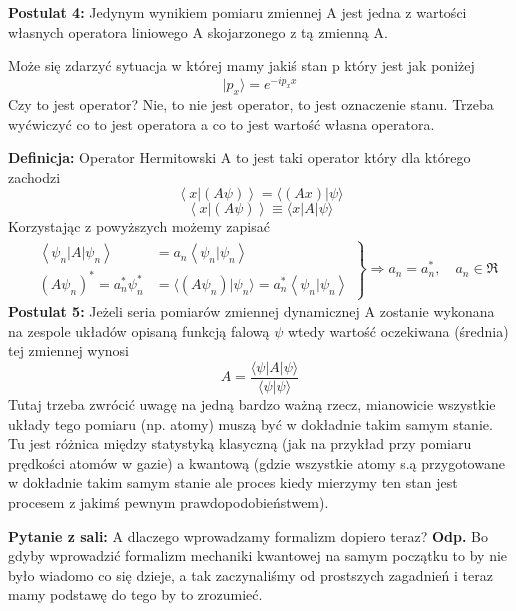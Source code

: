 \textbf{Postulat 4:} Jedynym wynikiem pomiaru zmiennej A jest jedna z wartości własnych operatora liniowego A skojarzonego z tą zmienną A.

Może się zdarzyć sytuacja w której mamy jakiś stan p który jest jak poniżej
\begin{equation*}
	|p_x \rangle = e^{-ip_x x}
\end{equation*}
Czy to jest operator? Nie, to nie jest operator, to jest oznaczenie stanu. Trzeba wyćwiczyć co to jest operatora a co to jest wartość własna operatora.

\textbf{Definicja:} Operator Hermitowski A to jest taki operator który dla którego zachodzi
\begin{equation*}
	\left< x | (A\psi) \right> = \langle (Ax) \vert \psi \rangle
\end{equation*}
\begin{equation*}
	\left< x | (A\psi) \right> \equiv \langle x | A \vert \psi \rangle
\end{equation*}
Korzystając z powyższych możemy zapisać
\begin{align*}
	&\left.
	\begin{aligned}
		\left< \psi_n | A | \psi_n \right> &= a_n \left< \psi_n | \psi_n \right> \\
		(A \psi_n)^* = a_n^* \psi_n^* &= \langle (A \psi_n) | \psi_n \rangle = a_n^* \left< \psi_n | \psi_n \right>
	\end{aligned}
	\right\}
	\Rightarrow a_n = a_n^*, \quad a_n \in \Re
\end{align*}
\textbf{Postulat 5:} Jeżeli seria pomiarów zmiennej dynamicznej A zostanie wykonana na zespole układów opisaną funkcją falową $\psi$ wtedy wartość oczekiwana (średnia) tej zmiennej wynosi
\begin{equation*}
	A = \frac{\langle \psi | A | \psi \rangle}{\langle\psi | \psi\rangle}
\end{equation*}
Tutaj trzeba zwrócić uwagę na jedną bardzo ważną rzecz, mianowicie wszystkie układy tego pomiaru (np. atomy) muszą być w dokładnie takim samym stanie. Tu jest różnica między statystyką klasyczną (jak na przykład przy pomiaru prędkości atomów w gazie) a kwantową (gdzie wszystkie atomy s.ą przygotowane w dokładnie takim samym stanie ale proces kiedy mierzymy ten stan jest procesem z jakimś pewnym prawdopodobieństwem).

\textbf{Pytanie z sali:} A dlaczego wprowadzamy formalizm dopiero teraz? \textbf{Odp.} Bo gdyby wprowadzić formalizm mechaniki kwantowej na samym początku to by nie było wiadomo co się dzieje, a tak zaczynaliśmy od prostszych zagadnień i teraz mamy podstawę do tego by to zrozumieć.

